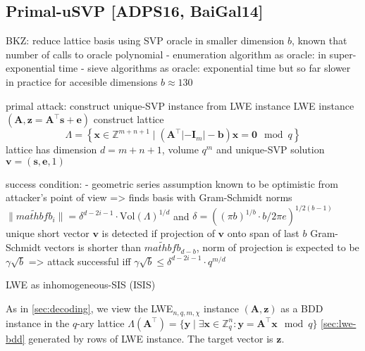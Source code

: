 {\subsection{Primal-uSVP [ADPS16, BaiGal14]} %

BKZ: reduce lattice basis using SVP oracle in smaller dimension $b$, known that number of calls to oracle polynomial
- enumeration algorithm as oracle: in super-exponential time
- sieve algorithms as oracle: exponential time but so far slower in practice for accesible dimensions $b\approx 130$

primal attack: construct unique-SVP instance from LWE instance %
LWE instance $(\mathbf{A}, \mathbf{z} = \mathbf{A}^\intercal \mathbf{s} + \mathbf{e})$
construct lattice 
\begin{equation}
  \Lambda = \left\{ \mathbf{x} \in \mathbb{Z}^{m+n+1} \mid (\mathbf{A}^\intercal | -\mathbf{I}_m | -\mathbf{b})\mathbf{x} = \mathbf{0} \mod q \right\} 
\end{equation}
lattice has dimension $d=m+n+1$, volume $q^m$ %
and unique-SVP solution $\mathbf{v} = (\mathbf{s}, \mathbf{e}, 1)$ %

success condition:
- geometric series assumption known to be optimistic from attacker's point of view
=> finds basis with Gram-Schmidt norms $\|\tilde{mathbf{b}}_i\| = \delta^{d - 2i-1} \cdot \text{Vol}(\Lambda)^{1/d}$ and $\delta = ((\pi b)^{1/b} \cdot b/2\pi e)^{1/2(b-1)}$ %
unique short vector $\mathbf{v}$ is detected if projection of $\mathbf{v}$ onto span of last $b$ Gram-Schmidt vectors is shorter than $\tilde{mathbf{b}}_{d-b}$, norm of projection is expected to be $\gamma \sqrt{b}$ => attack successful iff $\gamma \sqrt{b} \leq \delta^{d - 2i-1} \cdot q^{m/d}$

LWE as inhomogeneous-SIS (ISIS)

As in \cref{sec:decoding}, we view the LWE$_{n, q, m, \chi}$ instance $(\mathbf{A}, \mathbf{z})$ as a BDD instance in the  $q$-ary lattice $\Lambda(\mathbf{A}^\intercal) = \{ \mathbf{y} \mid \exists \mathbf{x} \in \mathbb{Z}_q^n : \mathbf{y} = \mathbf{A}^\intercal \mathbf{x}  \mod q \}$ \cref{sec:lwe-bdd} generated by rows of LWE instance. The target vector is $\mathbf{z}$. %

}
